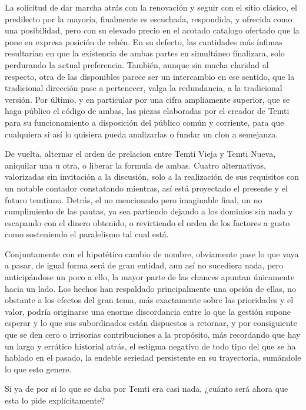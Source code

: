 \documentclass[
]{book}
\begin{document}
La solicitud de dar marcha atrás con la renovación y seguir con el sitio clásico, el predilecto por la mayoría, finalmente es escuchada, respondida, y ofrecida como una posibilidad, pero con su elevado precio en el acotado catalogo ofertado que la pone en expresa posición de rehén. En su defecto, las cantidades más ínfimas resultarían en que la existencia de ambas partes en simultáneo finalizara, solo perdurando la actual preferencia. También, aunque sin mucha claridad al respecto, otra de las disponibles parece ser un intercambio en ese sentido, que la tradicional dirección pase a pertenecer, valga la redundancia, a la tradicional versión. Por último, y en particular por una cifra ampliamente superior, que se haga público el código de ambas, las piezas elaboradas por el creador de Temti para su funcionamiento a disposición del público común y corriente, para que cualquiera si así lo quisiera pueda analizarlas o fundar un clon a semejanza.

De vuelta, alternar el orden de prelacion entre Temti Vieja y Temti Nueva, aniquilar una u otra, o liberar la formula de ambas. Cuatro alternativas, valorizadas sin invitación a la discusión, solo a la realización de sus requisitos con un notable contador constatando mientras, así está proyectado el presente y el futuro temtiano. Detrás, el no mencionado pero imaginable final, un no cumplimiento de las pautas, ya sea partiendo dejando a los dominios sin nada y escapando con el dinero obtenido, o revirtiendo el orden de los factores a gusto como sosteniendo el paralelismo tal cual está.

Conjuntamente con el hipotético cambio de nombre, obviamente pase lo que vaya a pasar, de igual forma será de gran entidad, aun así no sucediera nada, pero anticipándose un poco a ello, la mayor parte de las chances apuntan únicamente hacia un lado. Los hechos han respaldado principalmente una opción de ellas, no obstante a los efectos del gran tema, más exactamente sobre las prioridades y el valor, podría originarse una enorme discordancia entre lo que la gestión supone esperar y lo que sus subordinados están dispuestos a retornar, y por consiguiente que se den cero o irrisorias contribuciones a la propósito, más recordando que hay un largo y errático historial atrás, el estigma negativo de todo tipo del que se ha hablado en el pasado, la endeble seriedad persistente en su trayectoria, sumándole lo que esto genere.

Si ya de por sí lo que se daba por Temti era casi nada, ¿cuánto será ahora que esta lo pide explícitamente?
\end{document}
